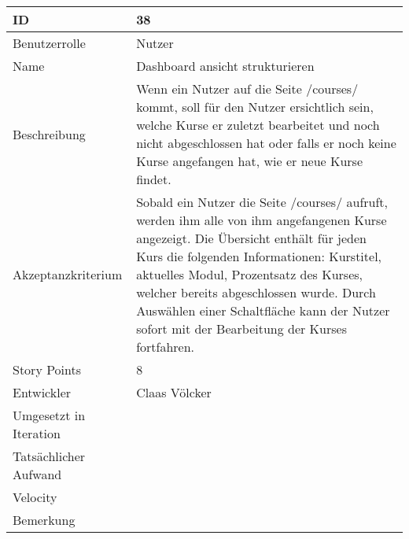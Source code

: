 \begin{tabularx}{\textwidth}{|p{}|X|}
	\hline
	ID & 38 \\
	\hline
	Benutzerrolle & Nutzer \\
	\hline
	Name & Dashboard ansicht strukturieren\\
	\hline
	Beschreibung & Wenn ein Nutzer auf die Seite /courses/ kommt, soll für den Nutzer ersichtlich sein, welche Kurse er zuletzt bearbeitet und noch nicht abgeschlossen hat oder falls er noch keine Kurse angefangen hat, wie er neue Kurse findet.  \\
	\hline
	Akzeptanzkriterium & Sobald ein Nutzer die Seite /courses/ aufruft, werden ihm alle von ihm angefangenen Kurse angezeigt. Die Übersicht enthält für jeden Kurs die folgenden Informationen: Kurstitel, aktuelles Modul, Prozentsatz des Kurses, welcher bereits abgeschlossen wurde. Durch Auswählen einer Schaltfläche kann der Nutzer sofort mit der Bearbeitung der Kurses fortfahren. \\
	\hline
	Story Points & 8\\
	\hline
	Entwickler & Claas Völcker\\
	\hline
	Umgesetzt in Iteration & \\
	\hline
	Tatsächlicher Aufwand & \\
	\hline
	Velocity & \\
	\hline
	Bemerkung & \\
	\hline
\end{tabularx}
\vspace{20pt}
